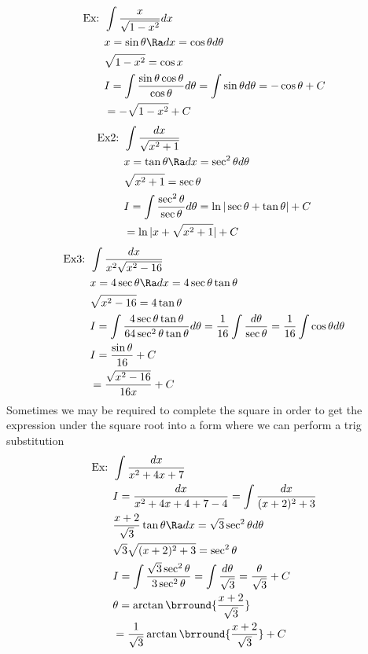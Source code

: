 \begin{align*}
    \text{Ex: }&\int \frac{x}{\sqrt{1-x^2}}dx\\
    &x=\sin \theta\Ra dx=\cos\theta d\theta\\
    &\sqrt{1-x^2}=\cos x\\
    &I=\int\frac{\sin\theta\cos\theta}{\cos\theta}d\theta=\int\sin\theta d\theta=-\cos\theta+C\\
    &=-\sqrt{1-x^2}+C
\end{align*}
\begin{align*}
    \text{Ex2: }&\int\frac{dx}{\sqrt{x^2+1}}\\
    &x=\tan\theta\Ra dx=\sec^2\theta d\theta\\
    &\sqrt{x^2+1}=\sec\theta\\
    &I=\int\frac{\sec^2\theta}{\sec\theta}d\theta=\ln|\sec\theta+\tan\theta|+C\\
    &=\ln|x+\sqrt{x^2+1}|+C
\end{align*}
\begin{align*}
    \text{Ex3: }&\int\frac{dx}{x^2\sqrt{x^2-16}}\\
    &x=4\sec\theta\Ra dx=4\sec\theta\tan\theta\\
    &\sqrt{x^2-16}=4\tan\theta\\
    &I=\int\frac{4\sec\theta\tan\theta}{64\sec^2\theta\tan\theta}d\theta=\frac{1}{16}\int\frac{d\theta}{\sec\theta}=\frac{1}{16}\int\cos\theta d\theta\\
    &I=\frac{\sin\theta}{16}+C\\
    &=\frac{\sqrt{x^2-16}}{16x}+C
\end{align*}
Sometimes we may be required to complete the square in order to get the expression under the square root into a form where we can perform a trig substitution
\begin{align*}
    \text{Ex: }&\int\frac{dx}{x^2+4x+7}\\
    &I=\frac{dx}{x^2+4x+4+7-4}=\int\frac{dx}{(x+2)^2+3}\\
    &\frac{x+2}{\sqrt{3}}\tan\theta\Ra dx=\sqrt{3}\sec^2\theta d\theta\\
    &\sqrt{3}\sqrt{(x+2)^2+3}=\sec^2\theta\\
    &I=\int\frac{\sqrt{3}\sec^2\theta}{3\sec^2\theta}=\int\frac{d\theta}{\sqrt{3}}=\frac{\theta}{\sqrt{3}}+C\\
    &\theta=\arctan\brround{\frac{x+2}{\sqrt{3}}}\\
    &=\frac{1}{\sqrt{3}}\arctan\brround{\frac{x+2}{\sqrt{3}}}+C
\end{align*}
